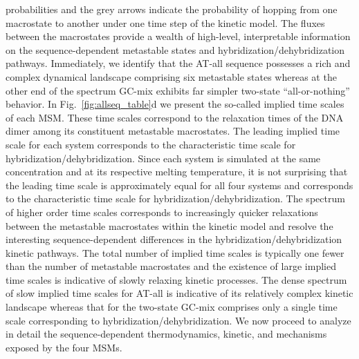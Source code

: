 \documentclass[journal=jpcbfk,manuscript=article]{achemso}
\begin{document}
probabilities and the grey arrows indicate the probability of hopping from one macrostate to another under one time step of the kinetic model. The fluxes between the macrostates provide a wealth of high-level, interpretable information on the sequence-dependent metastable states and hybridization/dehybridization pathways. Immediately, we identify that the AT-all sequence possesses a rich and complex dynamical landscape comprising six metastable states whereas at the other end of the spectrum GC-mix exhibits far simpler two-state ``all-or-nothing'' behavior. In Fig.~\ref{fig:allseq_table}d we present the so-called implied time scales of each MSM. These time scales correspond to the relaxation times of the DNA dimer among its constituent metastable macrostates. The leading implied time scale for each system corresponds to the characteristic time scale for hybridization/dehybridization. Since each system is simulated at the same concentration and at its respective melting temperature, it is not surprising that the leading time scale is approximately equal for all four systems and corresponds to the characteristic time scale for hybridization/dehybridization. The spectrum of higher order time scales corresponds to increasingly quicker relaxations between the metastable macrostates within the kinetic model and resolve the interesting sequence-dependent differences in the hybridization/dehybridization kinetic pathways. The total number of implied time scales is typically one fewer than the number of metastable macrostates and the existence of large implied time scales is indicative of slowly relaxing kinetic processes. The dense spectrum of slow implied time scales for AT-all is indicative of its relatively complex kinetic landscape whereas that for the two-state GC-mix comprises only a single time scale corresponding to hybridization/dehybridization. We now proceed to analyze in detail the sequence-dependent thermodynamics, kinetic, and mechanisms exposed by the four MSMs.
\end{document}
